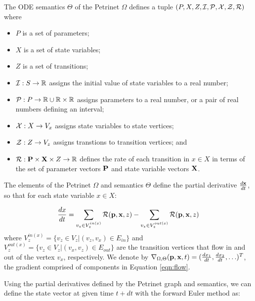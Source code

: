 \begin{definition}
    The ODE semantics $\Theta$ of the Petrinet $\Omega$ defines a tuple $(P, X,
    Z, {\cal I}, {\cal P}, {\cal X}, {\cal Z}, {\cal R})$ where 
    \begin{itemize}
        \item $P$ is a set of parameters;
        \item $X$ is a set of state variables;
        \item $Z$ is a set of transitions;
        \item ${\cal I}: S \rightarrow {\mathbb{R}}$ assigns the initial value of
        state variables to a real number;
        \item ${\cal P}: P \rightarrow {\mathbb{R}} \cup {\mathbb{R}} \times {\mathbb{R}}$ assigns
        parameters to a real number, or a pair of real numbers defining an
        interval;
        \item ${\cal X}: X \rightarrow V_x$ assigns state variables to state
        vertices;
        \item ${\cal Z}: Z \rightarrow V_z$ assigns transtions to transition
        vertices; and
        \item ${\cal R}: {\bf P} \times {\bf X} \times Z \rightarrow {\mathbb{R}}$
        defines the rate of each transition in $x \in X$ in terms of the set of
        parameter vectors ${\bf P}$ and state variable vectors ${\bf X}$.  
    \end{itemize}
    The elements of the Petrinet $\Omega$ and semantics $\Theta$ define the
    partial derivative $\frac{d {\bf x}}{dt}$, so that for each state variable
    $x \in X$:
    
    \begin{equation}\label{eqn:flow}
        \frac{dx}{dt} = \sum_{v_z \in V_z^{in(x)}} {\cal R}({\bf p}, {\bf x}, z) - \sum_{v_z \in V_z^{out(x)} } {\cal R}({\bf p}, {\bf x}, z)
    \end{equation}
\noindent where $V_z^{in(x)} = \{v_z \in V_z | (v_z, v_x) \in E_{in}\}$ and
    $V_z^{out(x)}=\{v_z \in V_z| (v_x, v_z) \in E_{out}\}$ are the transition
    vertices that flow in and out of the vertex $v_x$, respectively. We denote
    by $\nabla_{\Omega, \Theta}({\bf p}, {\bf x}, t) = (\frac{dx_1}{dt},
    \frac{dx_2}{dt}, \ldots)^T$, the gradient comprised of components in
    Equation \eqref{eqn:flow}.
\end{definition}

Using the partial derivatives defined by the Petrinet graph and semantics, we
can define the state vector at given time $t+dt$ with the forward Euler method
as:

